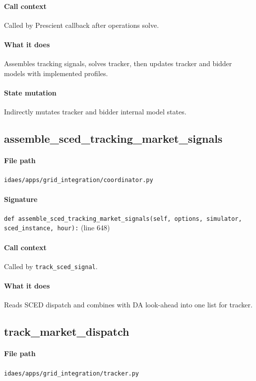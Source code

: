 \documentclass{article}
\begin{document}
\paragraph{Call context} Called by Prescient callback after operations solve.
\paragraph{What it does} Assembles tracking signals, solves tracker, then updates tracker and bidder models with implemented profiles.
\paragraph{State mutation} Indirectly mutates tracker and bidder internal model states.

\subsection{assemble\_sced\_tracking\_market\_signals}\label{fn:assemble_sced_tracking_market_signals}
\paragraph{File path} \texttt{idaes/apps/grid\_integration/coordinator.py}
\paragraph{Signature} \texttt{def assemble\_sced\_tracking\_market\_signals(self, options, simulator, sced\_instance, hour):} (line 648)
\paragraph{Call context} Called by \texttt{track\_sced\_signal}.
\paragraph{What it does} Reads SCED dispatch and combines with DA look-ahead into one list for tracker.

\subsection{track\_market\_dispatch}\label{fn:track_market_dispatch}
\paragraph{File path} \texttt{idaes/apps/grid\_integration/tracker.py}
\end{document}

